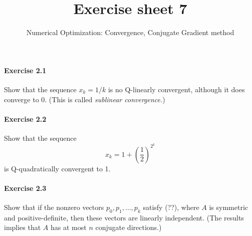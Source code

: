 
\title{Exercise sheet 7}
\subtitle{Numerical Optimization: Convergence, Conjugate Gradient method}
\usepackage{amsmath}
\newcommand\tp{\ensuremath{\text{\upshape T}}}

\maketitle

\paragraph{Exercise 2.1} %
Show that the sequence $x_k=1/k$ is no Q-linearly convergent, although it does converge to $0$. (This is called \emph{sublinear convergence.})

\paragraph{Exercise 2.2} %
Show that the sequence
\[
x_k = 1 + \left(\frac{1}{2}\right)^{2^k}
\]
is Q-quadratically convergent to 1.




\paragraph{Exercise 2.3}  %
Show that if the nonzero vectors $p_0, p_1,\dots, p_k$ satisfy (??), where $A$
is symmetric and positive-definite, then these vectors are linearly
independent. (The results implies that $A$ has at most $n$ conjugate
directions.)

